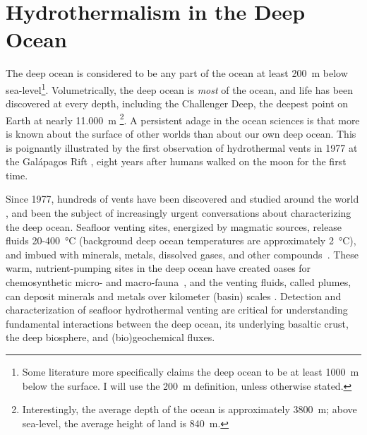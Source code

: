 \section{Hydrothermalism in the Deep Ocean}
\label{sec:charting-plumes}
The deep ocean is considered to be any part of the ocean at least \SI{200}{\meter} below sea-level\footnote{Some literature more specifically claims the deep ocean to be at least \SI{1000}{\meter} below the surface. I will use the \SI{200}{\meter} definition, unless otherwise stated.}.
Volumetrically, the deep ocean is \emph{most} of the ocean, and life has been discovered at every depth, including the Challenger Deep, the deepest point on Earth at nearly \SI{11,000}{\meter} \autocite{cario2019exploring}\footnote{Interestingly, the average depth of the ocean is approximately \SI{3800}{\meter}; above sea-level, the average height of land is \SI{840}{\meter}.}.
A persistent adage in the ocean sciences is that more is known about the surface of other worlds than about our own deep ocean.
This is poignantly illustrated by the first observation of hydrothermal vents in 1977 at the Galápagos Rift \autocite{corliss1979submarine}, eight years after humans walked on the moon for the first time.

Since 1977, hundreds of vents have been discovered and studied around the world \autocite{beaulieu2013authoritative}, and been the subject of increasingly urgent conversations about characterizing the deep ocean.
Seafloor venting sites, energized by magmatic sources, release fluids 20-\SI{400}{\celsius} (background deep ocean temperatures are approximately \SI{2}{\celsius}), and imbued with minerals, metals, dissolved gases, and other compounds~\autocite{jannasch1985geomicrobiology, martin2008hydrothermal}.
These warm, nutrient-pumping sites in the deep ocean have created oases for chemosynthetic micro- and macro-fauna~\autocite{corliss1979submarine}, and the venting fluids, called plumes, can deposit minerals and metals over kilometer (basin) scales \autocite{scholz2019shelf,resing2015basin,le2019hydrothermal}.
Detection and characterization of seafloor hydrothermal venting are critical for understanding fundamental interactions between the deep ocean, its underlying basaltic crust, the deep biosphere, and (bio)geochemical fluxes.


